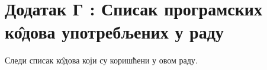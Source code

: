 \section{Додатак Г : Списак програмских к\^{о}дова употребљених у раду}
		Следи списак к\^{о}дова који су коришћени у овом раду.
		\lstlistoflistings
